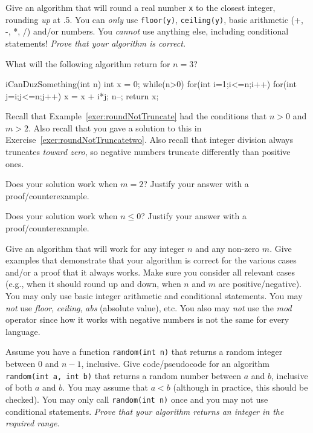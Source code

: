 \begin{pro}
Give an algorithm that will round a real number \verb+x+ to
the closest integer, rounding {\em up} at .5.
You can {\em only} use \verb+floor(y)+, \verb+ceiling(y)+, basic arithmetic (+, -, *, /) and/or numbers.
You {\em cannot} use anything else, including conditional statements!
{\em Prove that your algorithm is correct.}
\end{pro}

\begin{pro}
What will the following algorithm return for $n = 3$?
\begin{code}
	iCanDuzSomething(int n) {
	    int x = 0;
	    while(n>0) {
	        for(int i=1;i<=n;i++) {
	            for(int j=i;j<=n;j++) {
	                x = x + i*j;
	            } 
	        }
	        n--;
	    }
	    return x;
	}
\end{code}
\end{pro}


\begin{pro}
Recall that Example~\ref{exer:roundNotTruncate} had the conditions that $n>0$ and $m>2$.
Also recall that you gave a solution to this in Exercise~\ref{exer:roundNotTruncatetwo}.
Also recall that integer division always truncates {\em toward zero}, so negative numbers truncate
differently than positive ones.
\begin{lenum}
\item
Does your solution work when $m=2$?  Justify your answer with a proof/counterexample.
\item
Does your solution work when $n\leq 0$?  Justify your answer with a proof/counterexample.
\item
Give an algorithm that will work for any integer $n$ and any non-zero $m$.
Give examples that demonstrate that your algorithm is correct for the various cases and/or
a proof that it always works.  Make sure you consider all relevant cases (e.g., when it should
round up and down, when $n$ and $m$ are positive/negative).
You may only use basic integer arithmetic and conditional statements.
You may {\em not} use {\em floor}, {\em ceiling}, {\em abs} (absolute value), etc.  
You also may {\em not} use the {\em mod} operator since how it works with negative numbers 
is not the same for every language.
\end{lenum}
\end{pro}

\begin{pro}
Assume you have a function \verb+random(int n)+ that returns a random integer between $0$ and $n-1$, inclusive.
Give code/pseudocode for an algorithm \verb+random(int a, int b)+ that returns a random number between $a$ and $b$, inclusive of both $a$ and $b$.
You may assume that $a<b$ (although in practice, this should be checked).  
You may only call \verb+random(int n)+ once and you may not use conditional statements.
{\em Prove that your algorithm returns an integer in the required range.}
\end{pro}

